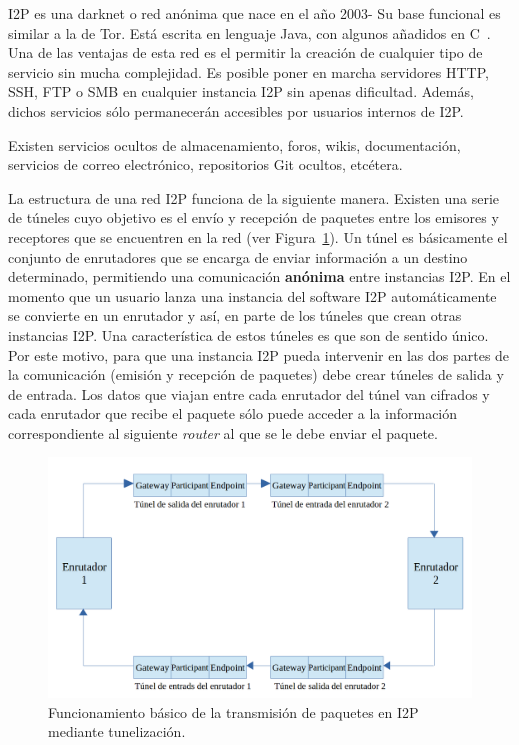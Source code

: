 I2P es una darknet o red anónima que nace en el año 2003- Su base funcional es similar a la de Tor. Está escrita en lenguaje Java, con algunos añadidos en C~\cite{article:i2p}.
Una de las ventajas de esta red es el permitir la creación de cualquier tipo de servicio sin mucha complejidad. Es posible poner en marcha servidores HTTP, SSH, FTP o SMB en cualquier instancia I2P sin apenas dificultad. Además, dichos servicios sólo permanecerán accesibles por usuarios internos de I2P.

Existen servicios ocultos de almacenamiento, foros, wikis, documentación, servicios de correo electrónico, repositorios Git ocultos, etcétera.

La estructura de una red I2P funciona de la siguiente manera.
Existen una serie de túneles cuyo objetivo es el envío y recepción de paquetes entre los emisores y receptores que se encuentren en la red (ver Figura~\ref{fig:I2PTunneling}). Un túnel es básicamente el conjunto de enrutadores que se encarga de enviar información a un destino determinado, permitiendo una comunicación \textbf{anónima} entre instancias I2P.
En el momento que un usuario lanza una instancia del software I2P automáticamente se convierte en un enrutador y así, en parte de los túneles que crean otras instancias I2P.
Una característica de estos túneles es que son de sentido único. Por este motivo, para que una instancia I2P pueda intervenir en las dos partes de la comunicación (emisión y recepción de paquetes) debe crear túneles de salida y de entrada. Los datos que viajan entre cada enrutador del túnel van cifrados y cada enrutador que recibe el paquete sólo puede acceder a la información correspondiente al siguiente \textit{router} al que se le debe enviar el paquete.

	\begin{figure}[h]
		\centerline{
			\mbox{\includegraphics[width=5.00in]{images/tunnel_i2p.png}}
		}
		\caption{Funcionamiento básico de la transmisión de paquetes en I2P mediante tunelización.}
		\label{fig:I2PTunneling}
	\end{figure}



